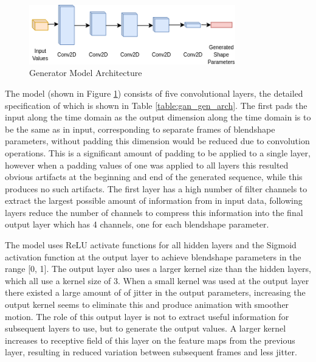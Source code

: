 \begin{figure}[h!]
    \centering
        \includegraphics[width=0.8\textwidth]{figures/gan/generator.png}
    \caption{Generator Model Architecture}\label{fig:gan_gen_arch}
\end{figure}

The model (shown in Figure \ref{fig:gan_gen_arch}) consists of five convolutional layers, the detailed specification of which is shown in Table \ref{table:gan_gen_arch}.
The first pads the input along the time domain as the output dimension along the time domain is to be the same as in input, corresponding to separate frames of blendshape parameters, without padding this dimension would be reduced due to convolution operations.
This is a significant amount of padding to be applied to a single layer, however when a padding values of one was applied to all layers this resulted obvious artifacts at the beginning and end of the generated sequence, while this produces no such artifacts.
The first layer has a high number of filter channels to extract the largest possible amount of information from in input data, following layers reduce the number of channels to compress this information into the final output layer which has 4 channels, one for each blendshape parameter.

The model uses ReLU activate functions for all hidden layers and the Sigmoid activation function at the output layer to achieve blendshape parameters in the range [0, 1].
The output layer also uses a larger kernel size than the hidden layers, which all use a kernel size of 3.
When a small kernel was used at the output layer there existed a large amount of of jitter in the output parameters, increasing the output kernel seems to eliminate this and produce animation with smoother motion.
The role of this output layer is not to extract useful information for subsequent layers to use, but to generate the output values.
A larger kernel increases to receptive field of this layer on the feature maps from the previous layer, resulting in reduced variation between subsequent frames and less jitter.


